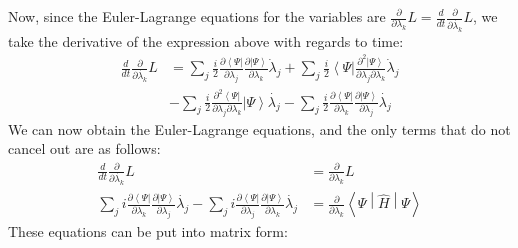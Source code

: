 \documentclass{aux/ttuthes2007}
\newcommand{\bra}[1]{\ensuremath{\left\langle#1\right\vert}}
\newcommand{\ket}[1]{\ensuremath{\left|#1\right\rangle}}
\newcommand{\sandwich}[3]{\left< #1 \middle\vert #2 \middle\vert #3 \right>}
\newcommand{\ddt}{\frac{d}{dt}}
\newcommand{\pd}[1]{\frac{\partial}{\partial #1}}
\newcommand{\kpp}[1]{\frac{\partial \ket\Psi}{\partial #1}}
\newcommand{\bpp}[1]{\frac{\partial \bra\Psi}{\partial #1}}
\newcommand{\kppd}[2]{\frac{\partial^{2} \ket\Psi}{\partial #1 \partial #2}}
\newcommand{\bppd}[2]{\frac{\partial^{2} \bra\Psi}{\partial #1 \partial #2}}
\begin{document}
%
Now, since the Euler-Lagrange equations for the variables are $\pd{\lambda_k} L = \ddt \pd{\dot {\lambda_k}} L$, we take the derivative of the expression above with regards to time:
%
\begin{equation*}
	\begin{split}
		\ddt \pd{\dot{\lambda_k}} L &=
		\sum_j \frac{i}{2}\bpp{\lambda_j}{\kpp {\lambda_k}} \dot \lambda_j
	+	\sum_j \frac{i}{2}\bra{\Psi}{\kppd {\lambda_j}{\lambda_k}} \dot \lambda_j \\
    	&- 	\sum_j \frac{i}{2}{\bppd{\lambda_j}{\lambda_k}}\ket{\Psi}\dot{\lambda_j}
	- 	\sum_j \frac{i}{2}{\bpp{\lambda_k}}\kpp{\lambda_j}\dot{\lambda_j}
	\end{split}
\end{equation*}
%
We can now obtain the Euler-Lagrange equations, and the only terms that do not cancel out are as follows:
%
\begin{equation*}
	\begin{split}
		\ddt \pd{\dot{\lambda_k}} L 
	&=	\pd{\lambda_k} L
	\\
	 	\sum_j i \bpp{\lambda_k} \kpp{\lambda_j}\dot{\lambda_j}
	-	\sum_j i \bpp{\lambda_j} \kpp{\lambda_k}\dot{\lambda_j}
	&= 	\pd{\lambda_k}\sandwich{\Psi}{\hat H}{\Psi}
	\end{split}
\end{equation*}
%
These equations can be put into matrix form:
%
\end{document}
